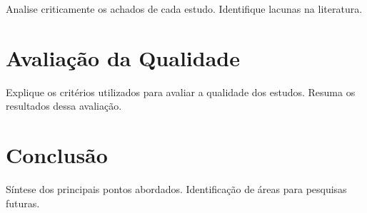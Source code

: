 \documentclass[a4paper,12pt]{article}
\begin{document}
Analise criticamente os achados de cada estudo. Identifique lacunas na literatura.

\section{Avaliação da Qualidade}
Explique os critérios utilizados para avaliar a qualidade dos estudos. Resuma os resultados dessa avaliação.

\section{Conclusão}
Síntese dos principais pontos abordados. Identificação de áreas para pesquisas futuras.

\printbibliography
\end{document}
